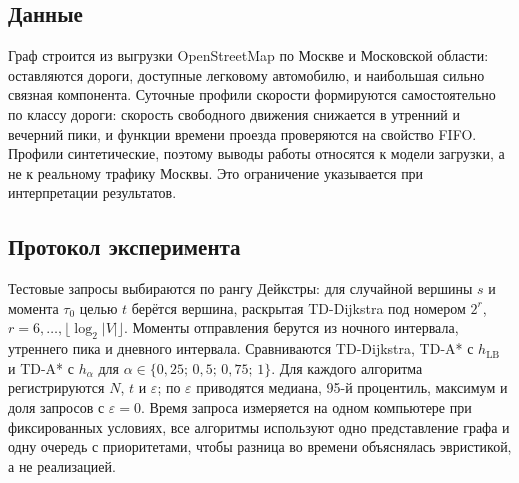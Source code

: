 \documentclass{misisarticle}
\begin{document}
\subsection{Данные}

Граф строится из выгрузки OpenStreetMap по Москве и Московской области: оставляются дороги, доступные легковому автомобилю, и наибольшая сильно связная компонента. Суточные профили скорости формируются самостоятельно по классу дороги: скорость свободного движения снижается в утренний и вечерний пики, и функции времени проезда проверяются на свойство FIFO. Профили синтетические, поэтому выводы работы относятся к модели загрузки, а не к реальному трафику Москвы. Это ограничение указывается при интерпретации результатов.

\subsection{Протокол эксперимента}

Тестовые запросы выбираются по рангу Дейкстры: для случайной вершины $s$ и момента $\tau_0$ целью $t$ берётся вершина, раскрытая TD-Dijkstra под номером $2^r$, $r = 6, \ldots, \lfloor \log_2 |V| \rfloor$. Моменты отправления берутся из ночного интервала, утреннего пика и дневного интервала. Сравниваются TD-Dijkstra, TD-A* с $h_{\mathrm{LB}}$ и TD-A* с $h_\alpha$ для $\alpha \in \{0{,}25;\, 0{,}5;\, 0{,}75;\, 1\}$. Для каждого алгоритма регистрируются $N$, $t$ и $\varepsilon$; по $\varepsilon$ приводятся медиана, 95-й процентиль, максимум и доля запросов с $\varepsilon = 0$. Время запроса измеряется на одном компьютере при фиксированных условиях, все алгоритмы используют одно представление графа и одну очередь с приоритетами, чтобы разница во времени объяснялась эвристикой, а не реализацией.
\end{document}
